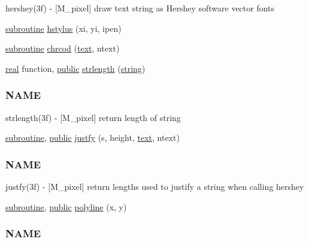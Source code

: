 \begin{DoxyCompactItemize}
\begin{DoxyCompactList}
hershey(3f) -\/ \mbox{[}M\+\_\+pixel\mbox{]} draw text string as Hershey software vector fonts \end{DoxyCompactList}\item 
\hyperlink{M__stopwatch_83_8txt_acfbcff50169d691ff02d4a123ed70482}{subroutine} \hyperlink{namespacem__pixel_a15c5daa9ab477991c2c6e17741cf40eb}{hstylus} (xi, yi, ipen)
\item 
\hyperlink{M__stopwatch_83_8txt_acfbcff50169d691ff02d4a123ed70482}{subroutine} \hyperlink{namespacem__pixel_ab25c6cce708ff91a79bbabb23d591a8b}{chrcod} (\hyperlink{notes_8txt_ad997a48ee1fbabed5333859846b5d9a3}{text}, ntext)
\item 
\hyperlink{read__watch_83_8txt_abdb62bde002f38ef75f810d3a905a823}{real} function, \hyperlink{M__stopwatch_83_8txt_a2f74811300c361e53b430611a7d1769f}{public} \hyperlink{namespacem__pixel_a0468f8d9308bade7f8f2a68a133271d2}{strlength} (\hyperlink{what__overview_81_8txt_a74cb7e955273b9f9157b4f0c18a38849}{string})
\begin{DoxyCompactList}\small\item\em \subsubsection*{N\+A\+ME}

strlength(3f) -\/ \mbox{[}M\+\_\+pixel\mbox{]} return length of string \end{DoxyCompactList}\item 
\hyperlink{M__stopwatch_83_8txt_acfbcff50169d691ff02d4a123ed70482}{subroutine}, \hyperlink{M__stopwatch_83_8txt_a2f74811300c361e53b430611a7d1769f}{public} \hyperlink{namespacem__pixel_a7b08886c913b47694edeb60fa747afc4}{justfy} (s, height, \hyperlink{notes_8txt_ad997a48ee1fbabed5333859846b5d9a3}{text}, ntext)
\begin{DoxyCompactList}\small\item\em \subsubsection*{N\+A\+ME}

justfy(3f) -\/ \mbox{[}M\+\_\+pixel\mbox{]} return lengths used to justify a string when calling hershey \end{DoxyCompactList}\item 
\hyperlink{M__stopwatch_83_8txt_acfbcff50169d691ff02d4a123ed70482}{subroutine}, \hyperlink{M__stopwatch_83_8txt_a2f74811300c361e53b430611a7d1769f}{public} \hyperlink{namespacem__pixel_a067e896f50047694a52c30cffa6f502f}{polyline} (x, y)
\begin{DoxyCompactList}\small\item\em \subsubsection*{N\+A\+ME}


\end{DoxyCompactList}
\end{DoxyCompactItemize}
